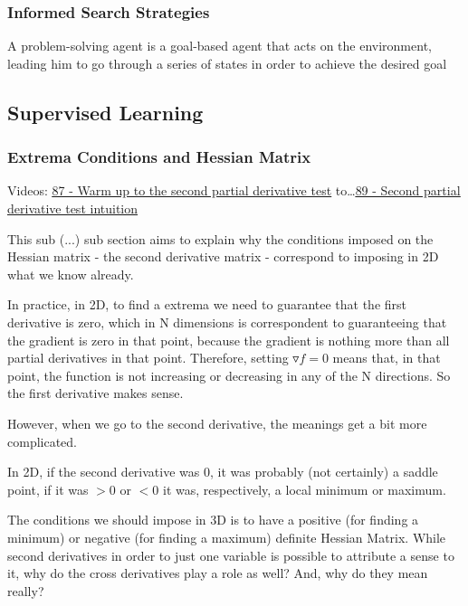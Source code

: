 \subsubsection{Informed Search Strategies}
A problem-solving agent is a goal-based agent that acts on the environment,
leading him to go through a series of states in order to achieve the desired goal


\subsection{Supervised Learning}





\subsubsection*{Extrema Conditions and Hessian Matrix}

Videos: \href{https://www.youtube.com/watch?v=nRJM4mY-Pq0&list=PLSQl0a2vh4HC5feHa6Rc5c0wbRTx56nF7&index=87}{\ul{87 - Warm up to the second partial derivative test}} to\dots \href{https://www.youtube.com/watch?v=sJo7D74PAak&list=PLSQl0a2vh4HC5feHa6Rc5c0wbRTx56nF7&index=89}{\ul{89 - Second partial derivative test intuition}}




This sub (...) sub section aims to explain why the conditions imposed on the Hessian matrix - the second derivative matrix - correspond to imposing in 2D what we know already.

In practice, in 2D, to find a extrema we need to guarantee that the first derivative is zero, which in N dimensions is correspondent to guaranteeing that the gradient is zero in that point, because the gradient is nothing more than all partial derivatives in that point. Therefore, setting $\triangledown f = 0$ means that, in that point, the function is not increasing or decreasing in any of the N directions. So the first derivative makes sense.

However, when we go to the second derivative, the meanings get a bit more complicated.

In 2D, if the second derivative was 0, it was probably (not certainly) a saddle point, if it was $> 0$ or $< 0$ it was, respectively, a local minimum or maximum.

The conditions we should impose in 3D is to have a positive (for finding a minimum) or negative (for finding a maximum) definite Hessian Matrix. While second derivatives in order to just one variable is possible to attribute a sense to it, why do the cross derivatives play a role as well? And, why do they mean really?

